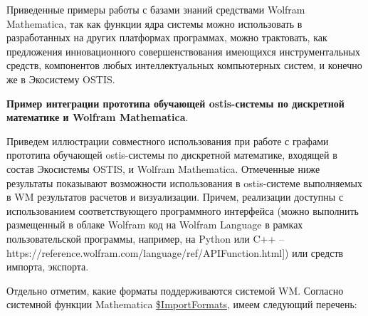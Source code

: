 Приведенные примеры работы с базами знаний средствами Wolfram Mathematica, так как функции ядра системы можно использовать в разработанных на других платформах программах, можно трактовать, как предложения инновационного совершенствования имеющихся инструментальных средств, компонентов любых интеллектуальных компьютерных систем, и конечно же в Экосистему OSTIS. 

\textbf{Пример интеграции прототипа обучающей ostis-системы по дискретной математике и Wolfram Mathematica}.

Приведем иллюстрации совместного использования при работе с графами прототипа обучающей ostis-системы по дискретной математике, входящей в состав Экосистемы OSTIS, и Wolfram Mathematica. Отмеченные ниже результаты показывают возможности использования в ostis-системе выполняемых в WM результатов расчетов и визуализации. Причем, реализации доступны с использованием соответствующего программного интерфейса (можно выполнить размещенный в облаке Wolfram код на Wolfram Language в рамках пользовательской программы, например, на Python или C++ -- https://reference.wolfram.com/language/ref/APIFunction.html]) или средств импорта, экспорта. 

Отдельно отметим, какие форматы поддерживаются системой WM. Согласно системной функции Mathematica \underline{\$ImportFormats}, имеем следующий перечень: 

